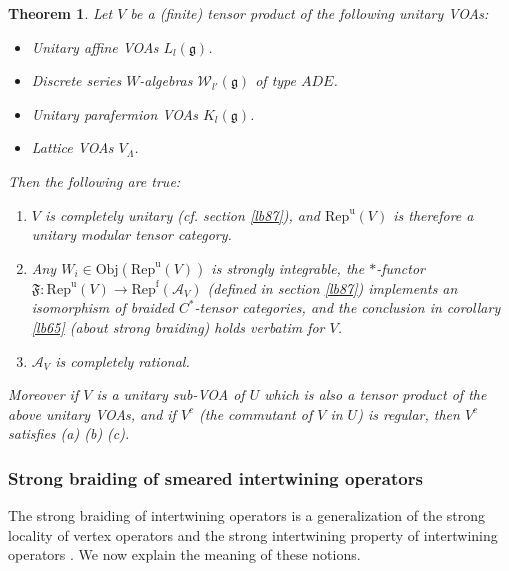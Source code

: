 \documentclass[11pt,b5paper,notitlepage]{article}
\theoremstyle{definition}
\theoremstyle{plain}
\newtheorem{thmn}{Theorem}
\newcommand{\fk}{\mathfrak}
\newcommand{\mc}{\mathcal}
\newcommand{\gk}{\mathfrak g}
\newcommand{\Repf}{\mathrm{Rep}^{\mathrm f}}
\newcommand{\RepuV}{\mathrm{Rep}^{\mathrm u}(V)}
\newcommand{\Obj}{\mathrm{Obj}}
\numberwithin{equation}{subsection}
\begin{document}
\begin{thmn}\label{lb94}
	Let $V$ be a (finite) tensor product of the following unitary VOAs:
	\begin{itemize}
		\item Unitary affine VOAs $L_l(\gk)$.
		\item Discrete series $W$-algebras $\mc W_{l'}(\gk)$ of type $ADE$.
		\item Unitary parafermion VOAs $K_l(\gk)$.
		\item Lattice VOAs $V_{\Lambda}$.
	\end{itemize}
Then  the following are true:
	
	\begin{enumerate}[label=(\alph*)]
		\item $V$ is completely unitary (cf. section \ref{lb87}), and  $\RepuV$ is therefore a unitary modular tensor category. 
		\item Any $W_i\in\Obj(\RepuV)$ is strongly integrable, the $*$-functor $\fk F:\RepuV\rightarrow\Repf(\mc A_V)$ (defined in section \ref{lb87}) implements an isomorphism of braided $C^*$-tensor categories, and the conclusion in corollary \ref{lb65} (about strong braiding) holds verbatim for $V$.
		\item $\mc A_V$ is completely rational.
	\end{enumerate}
	
	
	
	
	Moreover if $V$ is a unitary sub-VOA of $U$ which   is also a tensor product of the above unitary VOAs, and if  $V^c$ (the commutant of $V$ in $U$) is regular, then $V^c$ satisfies  (a) (b) (c).
\end{thmn}












\subsubsection*{Strong braiding of smeared intertwining operators}



The strong braiding of intertwining operators is  a generalization of the strong locality of vertex operators \cite{CKLW18} and the strong intertwining property of intertwining operators \cite{Gui19b}. We now explain the meaning of these notions.
\end{document}
